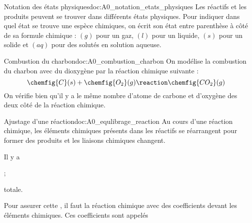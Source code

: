 \begin{doc}{Notation des états physiques}{doc:A0_notation_etats_physiques}
  Les réactifs et les produits peuvent se trouver dans différents états physiques.
  Pour indiquer dans quel état se trouve une espèce chimiques, on écrit son état entre parenthèse à côté de sa formule chimique : $(g)$ pour un gaz, $(l)$ pour un liquide, $(s)$ pour un solide et $(aq)$ pour des solutés en solution aqueuse.
\end{doc}


\begin{doc}{Combustion du charbon}{doc:A0_combustion_charbon}
  On modélise la combustion du charbon avec du dioxygène par la réaction chimique suivante :
  \begin{equation*}
    \chemfig{C}(s) + \chemfig{O_2}(g) \reaction \chemfig{CO_2}(g)
  \end{equation*}
  On vérifie bien qu'il y a le même nombre d'atome de carbone et d'oxygène des deux côté de la réaction chimique.
\end{doc}




\begin{doc}{Ajustage d'une réaction}{doc:A0_equlibrage_reaction}
  Au cours d'une réaction chimique, les éléments chimiques présents dans les réactifs se réarrangent pour former des produits et les liaisons chimiques changent.
  \begin{encart}
    Il y a  
    \begin{listePoints}
      \item {} ;
      \item {} totale.
    \end{listePoints}
  \end{encart}
  \begin{encart}
    Pour assurer cette , il faut  la réaction chimique avec des coefficients devant les éléments chimiques.
    Ces coefficients sont appelés 
  \end{encart}
\end{doc}

